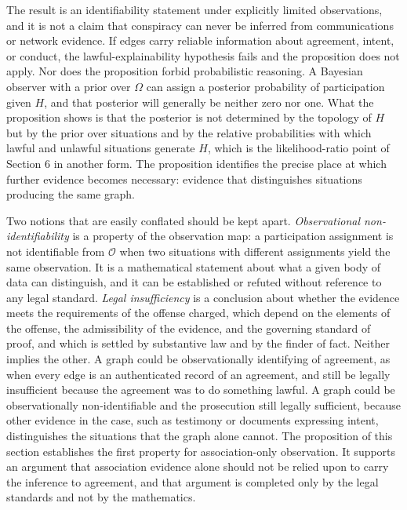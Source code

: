 \documentclass[11pt]{article}
\theoremstyle{definition}
\theoremstyle{remark}
\begin{document}
The result is an identifiability statement under explicitly limited observations, and it is not a claim that conspiracy can never be inferred from communications or network evidence. If edges carry reliable information about agreement, intent, or conduct, the lawful-explainability hypothesis fails and the proposition does not apply. Nor does the proposition forbid probabilistic reasoning. A Bayesian observer with a prior over $\Omega$ can assign a posterior probability of participation given $H$, and that posterior will generally be neither zero nor one. What the proposition shows is that the posterior is not determined by the topology of $H$ but by the prior over situations and by the relative probabilities with which lawful and unlawful situations generate $H$, which is the likelihood-ratio point of Section 6 in another form. The proposition identifies the precise place at which further evidence becomes necessary: evidence that distinguishes situations producing the same graph.

Two notions that are easily conflated should be kept apart. \emph{Observational non-identifiability} is a property of the observation map: a participation assignment is not identifiable from $\mathcal{O}$ when two situations with different assignments yield the same observation. It is a mathematical statement about what a given body of data can distinguish, and it can be established or refuted without reference to any legal standard. \emph{Legal insufficiency} is a conclusion about whether the evidence meets the requirements of the offense charged, which depend on the elements of the offense, the admissibility of the evidence, and the governing standard of proof, and which is settled by substantive law and by the finder of fact. Neither implies the other. A graph could be observationally identifying of agreement, as when every edge is an authenticated record of an agreement, and still be legally insufficient because the agreement was to do something lawful. A graph could be observationally non-identifiable and the prosecution still legally sufficient, because other evidence in the case, such as testimony or documents expressing intent, distinguishes the situations that the graph alone cannot. The proposition of this section establishes the first property for association-only observation. It supports an argument that association evidence alone should not be relied upon to carry the inference to agreement, and that argument is completed only by the legal standards and not by the mathematics.
\end{document}
